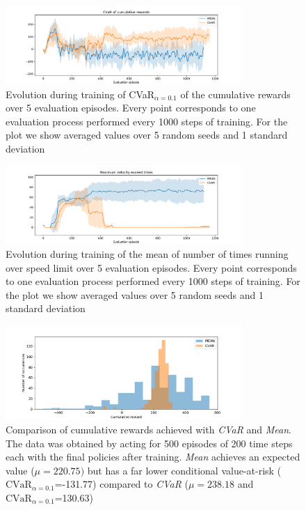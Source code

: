 \begin{figure}[ht]
        \centering
        \includegraphics[width=0.8\textwidth]{images/Cheetah_offpolicy_medium/cvar_train_withstds.pdf}
        \caption{Evolution during training of CVaR$_{\alpha=0.1}$ of the cumulative rewards over 5 evaluation episodes.
        Every point corresponds to one evaluation process performed every 1000 steps of training. For the plot we
        show averaged values over 5 random seeds and 1 standard deviation}
        \label{fig:cvar_cheetah}
    
\end{figure}


\begin{figure}[ht]
    \centering
    \includegraphics[width=0.8\textwidth]{images/Cheetah_offpolicy_medium/times_exceedvel_withstds.pdf}
    \caption{Evolution during training of the mean of number of times running over speed limit over 5 evaluation episodes.
    Every point corresponds to one evaluation process performed every 1000 steps of training.
    For the plot we show averaged values over 5 random seeds and 1 standard deviation}
    \label{fig:vel_exceed_cheetah}

\end{figure}

\begin{figure}[ht]
    \centering
    \includegraphics[width=0.8\textwidth]{images/Cheetah_offpolicy_medium/hist_evaluation_numevalsteps200_500eps.pdf}
    \caption{Comparison of cumulative rewards achieved with \textit{CVaR} and \textit{Mean}.
    The data was obtained by acting for 500 episodes of 200 time steps each with the final policies after training.
    \textit{Mean} achieves an expected value  ($\mu=220.75)$  but 
    has a far lower conditional value-at-risk ($\text{CVaR}_{\alpha= 0.1}$=-131.77) compared to
    \textit{CVaR} ($\mu=238.18$ and $\text{CVaR}_{\alpha= 0.1}$=130.63)}
    \label{fig:hist_cum_rewards200steps_cheetah}
\end{figure}

